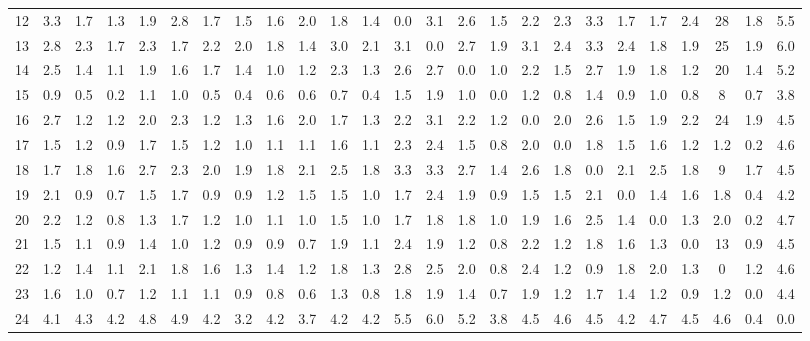 \begin{table}[htbp]
\begin{tabular}{c|cccccccccccccccccccccccc}
12 & 3.3 & 1.7 & 1.3 & 1.9 & 2.8 & 1.7 & 1.5 & 1.6 & 2.0 & 1.8 & 1.4 & 0.0 & 3.1 & 2.6 & 1.5 & 2.2 & 2.3 & 3.3 & 1.7 & 1.7 & 2.4 & 28 & 1.8 & 5.5 \\
13 & 2.8 & 2.3 & 1.7 & 2.3 & 1.7 & 2.2 & 2.0 & 1.8 & 1.4 & 3.0 & 2.1 & 3.1 & 0.0 & 2.7 & 1.9 & 3.1 & 2.4 & 3.3 & 2.4 & 1.8 & 1.9 & 25 & 1.9 & 6.0 \\
14 & 2.5 & 1.4 & 1.1 & 1.9 & 1.6 & 1.7 & 1.4 & 1.0 & 1.2 & 2.3 & 1.3 & 2.6 & 2.7 & 0.0 & 1.0 & 2.2 & 1.5 & 2.7 & 1.9 & 1.8 & 1.2 & 20 & 1.4 & 5.2 \\
15 & 0.9 & 0.5 & 0.2 & 1.1 & 1.0 & 0.5 & 0.4 & 0.6 & 0.6 & 0.7 & 0.4 & 1.5 & 1.9 & 1.0 & 0.0 & 1.2 & 0.8 & 1.4 & 0.9 & 1.0 & 0.8 & 8 & 0.7 & 3.8 \\
16 & 2.7 & 1.2 & 1.2 & 2.0 & 2.3 & 1.2 & 1.3 & 1.6 & 2.0 & 1.7 & 1.3 & 2.2 & 3.1 & 2.2 & 1.2 & 0.0 & 2.0 & 2.6 & 1.5 & 1.9 & 2.2 & 24 & 1.9 & 4.5 \\
17 & 1.5 & 1.2 & 0.9 & 1.7 & 1.5 & 1.2 & 1.0 & 1.1 & 1.1 & 1.6 & 1.1 & 2.3 & 2.4 & 1.5 & 0.8 & 2.0 & 0.0 & 1.8 & 1.5 & 1.6 & 1.2 & 1.2 & 0.2 & 4.6 \\
18 & 1.7 & 1.8 & 1.6 & 2.7 & 2.3 & 2.0 & 1.9 & 1.8 & 2.1 & 2.5 & 1.8 & 3.3 & 3.3 & 2.7 & 1.4 & 2.6 & 1.8 & 0.0 & 2.1 & 2.5 & 1.8 & 9 & 1.7 & 4.5 \\
19 & 2.1 & 0.9 & 0.7 & 1.5 & 1.7 & 0.9 & 0.9 & 1.2 & 1.5 & 1.5 & 1.0 & 1.7 & 2.4 & 1.9 & 0.9 & 1.5 & 1.5 & 2.1 & 0.0 & 1.4 & 1.6 & 1.8 & 0.4 & 4.2 \\
20 & 2.2 & 1.2 & 0.8 & 1.3 & 1.7 & 1.2 & 1.0 & 1.1 & 1.0 & 1.5 & 1.0 & 1.7 & 1.8 & 1.8 & 1.0 & 1.9 & 1.6 & 2.5 & 1.4 & 0.0 & 1.3 & 2.0 & 0.2 & 4.7 \\
21 & 1.5 & 1.1 & 0.9 & 1.4 & 1.0 & 1.2 & 0.9 & 0.9 & 0.7 & 1.9 & 1.1 & 2.4 & 1.9 & 1.2 & 0.8 & 2.2 & 1.2 & 1.8 & 1.6 & 1.3 & 0.0 & 13 & 0.9 & 4.5 \\
22 & 1.2 & 1.4 & 1.1 & 2.1 & 1.8 & 1.6 & 1.3 & 1.4 & 1.2 & 1.8 & 1.3 & 2.8 & 2.5 & 2.0 & 0.8 & 2.4 & 1.2 & 0.9 & 1.8 & 2.0 & 1.3 & 0 & 1.2 & 4.6 \\
23 & 1.6 & 1.0 & 0.7 & 1.2 & 1.1 & 1.1 & 0.9 & 0.8 & 0.6 & 1.3 & 0.8 & 1.8 & 1.9 & 1.4 & 0.7 & 1.9 & 1.2 & 1.7 & 1.4 & 1.2 & 0.9 & 1.2 & 0.0 & 4.4 \\
24 & 4.1 & 4.3 & 4.2 & 4.8 & 4.9 & 4.2 & 3.2 & 4.2 & 3.7 & 4.2 & 4.2 & 5.5 & 6.0 & 5.2 & 3.8 & 4.5 & 4.6 & 4.5 & 4.2 & 4.7 & 4.5 & 4.6 & 0.4 & 0.0 \\
\hline
\end{tabular}
\end{table}



